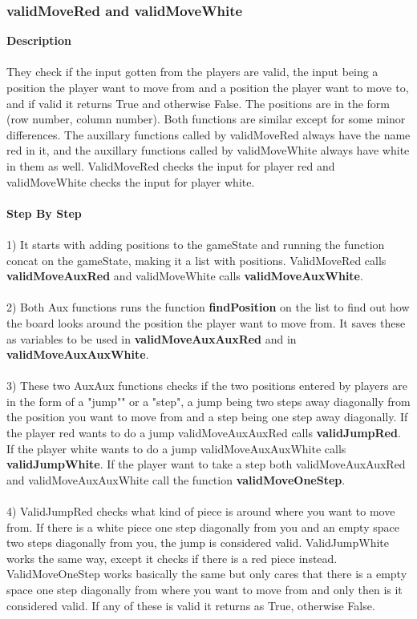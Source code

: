\documentclass[12pt,a4paper]{article}
\begin{document}
{\subsubsection{validMoveRed and validMoveWhite}}
\textbf{Description}
\\\\They check if the input gotten from the players are valid, the input being a position the player want to move from and a position the player want to move to, and if valid it returns True and otherwise False. The positions are in the form (row number, column number). Both functions are similar except for some minor differences. The auxillary functions called by validMoveRed always have the name red in it, and the auxillary functions called by validMoveWhite always have white in them as well. ValidMoveRed checks the input for player red and validMoveWhite checks the input for player white.\\\\
\textbf{Step By Step}\\\\
1) It starts with adding positions to the gameState and running the function concat on the gameState, making it a list with positions. ValidMoveRed calls {\textbf{\small{validMoveAuxRed}}} and
validMoveWhite calls {\textbf{\small{validMoveAuxWhite}}}.
\\\\
2) Both Aux functions runs the function {\textbf{\small{findPosition}}} on the list to find out how the board looks around the position the player want to move from. It saves these as variables to be used in 
{\textbf{\small{validMoveAuxAuxRed}}} and in \\
{\textbf{\small{validMoveAuxAuxWhite}}}.
\\\\
3) These two AuxAux functions checks if the two positions entered by players are in the form of a "jump"" or a "step", a jump being two steps away diagonally from the position you want to move from and a step being one step away diagonally. If the player red wants to do a jump validMoveAuxAuxRed calls {\textbf{\small{validJumpRed}}}.
If the player white wants to do a jump validMoveAuxAuxWhite calls {\textbf{\small{validJumpWhite}}}. If the player want to take a step
both validMoveAuxAuxRed and validMoveAuxAuxWhite call the function
{\textbf{\small{validMoveOneStep}}}.\\\\
4) ValidJumpRed checks what kind of piece is around where you want to move from. If there is a white piece one step diagonally from you and an empty space two steps diagonally from you, the jump is considered valid. 
ValidJumpWhite works the same way, except it checks if there is a red piece instead.
ValidMoveOneStep works basically the same but only cares that there is a empty space one step diagonally from where you want to move from and only then is it considered valid.
If any of these is valid it returns as True,
otherwise False. 
\\\\
\end{document}
